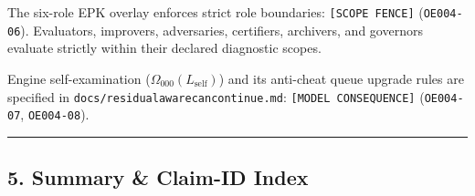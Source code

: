 \documentclass[
  11pt,
]{article}
\renewcommand{\_}{\origunderscore\allowbreak}
\begin{document}
The six-role EPK overlay enforces strict role boundaries:
\texttt{{[}SCOPE\ FENCE{]}} (\texttt{OE004-06}). Evaluators, improvers,
adversaries, certifiers, archivers, and governors evaluate strictly
within their declared diagnostic scopes.

Engine self-examination (\(\Omega_{000}(L_{\text{self}})\)) and its
anti-cheat queue upgrade rules are specified in
\texttt{docs/residual\_aware\_can\_continue.md}:
\texttt{{[}MODEL\ CONSEQUENCE{]}} (\texttt{OE004-07},
\texttt{OE004-08}).

\begin{center}\rule{0.5\linewidth}{0.5pt}\end{center}

\subsection{5. Summary \& Claim-ID Index}\label{summary-claim-id-index}
\end{document}
